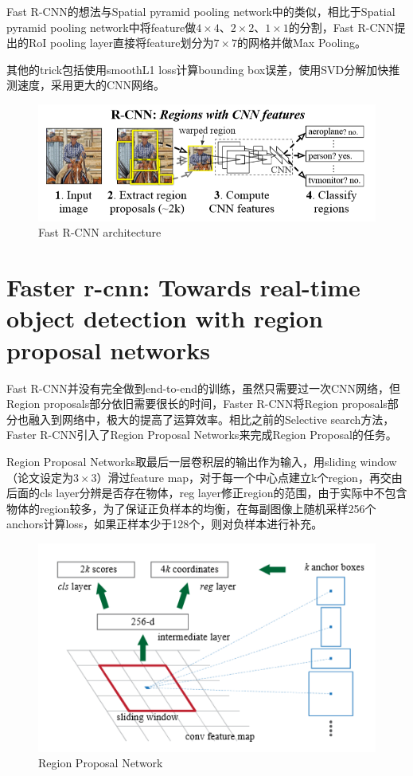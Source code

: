 \documentclass[12pt,onecolumn]{article}
\begin{document}
    Fast R-CNN的想法与Spatial pyramid pooling network中的类似，相比于Spatial pyramid pooling network中将feature做$4\times 4$、$2\times 2$、$1\times 1$的分割，Fast R-CNN提出的RoI pooling layer直接将feature划分为$7\times 7$的网格并做Max Pooling。

    其他的trick包括使用smoothL1 loss计算bounding box误差，使用SVD分解加快推测速度，采用更大的CNN网络。

    \begin{figure}[htb]
        \centering
        \includegraphics[width=\linewidth]{figure/rcnn.png}
        \caption{Fast R-CNN architecture}
    \end{figure}

    \section{Faster r-cnn: Towards real-time object detection with region proposal networks\cite{ren2015faster}}

    Fast R-CNN并没有完全做到end-to-end的训练，虽然只需要过一次CNN网络，但Region proposals部分依旧需要很长的时间，Faster R-CNN将Region proposals部分也融入到网络中，极大的提高了运算效率。相比之前的Selective search方法，Faster R-CNN引入了Region Proposal Networks来完成Region Proposal的任务。

    Region Proposal Networks取最后一层卷积层的输出作为输入，用sliding window（论文设定为$3\times 3$）滑过feature map，对于每一个中心点建立k个region，再交由后面的cls layer分辨是否存在物体，reg layer修正region的范围，由于实际中不包含物体的region较多，为了保证正负样本的均衡，在每副图像上随机采样256个anchors计算loss，如果正样本少于128个，则对负样本进行补充。

    \begin{figure}[htb]
        \centering
        \includegraphics[width=\linewidth]{figure/rpn.png}
        \caption{Region Proposal Network}
    \end{figure}
\end{document}
